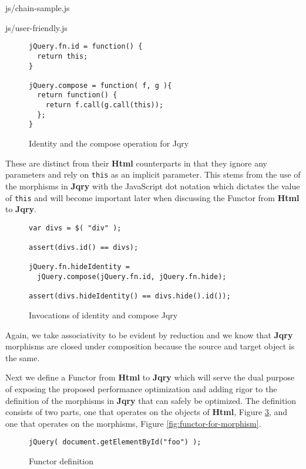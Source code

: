 \documentclass[preprint]{sigplanconf}
\begin{document}
\begin{lstinputlisting}[
    language=JavaScript,
    caption={Sources of Html objects},
    label={lst:chain-sample}
]{js/chain-sample.js}
\begin{lstinputlisting}[
    language=JavaScript,
    caption={User friendly overhead},
    label={lst:user-friendly}
]{js/user-friendly.js}
\begin{figure}[!ht]
\small
\begin{verbatim}
jQuery.fn.id = function() {
  return this;
}

jQuery.compose = function( f, g ){
  return function() {
    return f.call(g.call(this));
  };
}
\end{verbatim}
\nocaptionrule \caption{Identity and the compose operation for Jqry}
\label{fig:jquery-id-compose}
\end{figure}

These are distinct from their \textbf{Html} counterparts in that they ignore any parameters and rely on \verb|this| as an implicit parameter. This stems from the use of the morphisms in \textbf{Jqry} with the JavaScript dot notation which dictates the value of \verb|this| and will become important later when discussing the Functor from \textbf{Html} to \textbf{Jqry}.


\begin{figure}[!ht]
\small
\begin{verbatim}
var divs = $( "div" );

assert(divs.id() == divs);

jQuery.fn.hideIdentity =
  jQuery.compose(jQuery.fn.id, jQuery.fn.hide);

assert(divs.hideIdentity() == divs.hide().id());
\end{verbatim}
\nocaptionrule \caption{Invocations of identity and compose Jqry}
\label{fig:sample-jqry-compose}
\end{figure}

Again, we take associativity to be evident by reduction and we know that \textbf{Jqry} morphisms are closed under composition because the source and target object is the same.

Next we define a Functor from \textbf{Html} to \textbf{Jqry} which will serve the dual purpose of exposing the proposed performance optimization and adding rigor to the definition of the morphisms in \textbf{Jqry} that can safely be optimized. The definition consists of two parts, one that operates on the objects of \textbf{Html}, Figure \ref{fig:functor-for-object}, and one that operates on the morphisms, Figure \ref{fig:functor-for-morphism}.

\begin{figure}[!ht]
\small
\begin{verbatim}
jQuery( document.getElementById("foo") );
\end{verbatim}
\nocaptionrule \caption{Functor definition}
\label{fig:functor-for-object}
\end{figure}


\end{lstinputlisting}
\end{lstinputlisting}
\end{document}
